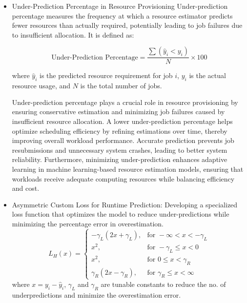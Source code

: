 \begin{itemize}
    where: \( a = y - \hat{y} \) is the residual (difference between actual and predicted values). \( \delta \) is a threshold that determines the transition between MSE and MAE.
    Huber loss is less sensitive to outliers compared to MSE and RMSE, providing a balanced approach between squared and absolute error penalties. However, it requires tuning of the threshold parameter \( \delta \), which can be challenging, and is more complex to implement than MSE and RMSE.
    \item Under-Prediction Percentage in Resource Provisioning
    Under-prediction percentage measures the frequency at which a resource estimator predicts fewer resources than actually required, potentially leading to job failures due to insufficient allocation. It is defined as:

    \begin{equation}
    \text{Under-Prediction Percentage} = \frac{\sum ( \hat{y}_i < y_i )}{N} \times 100
    \end{equation}
    
    where \( \hat{y}_i \) is the predicted resource requirement for job \( i \), \( y_i \) is the actual resource usage, and \( N \) is the total number of jobs.
    
    Under-prediction percentage plays a crucial role in resource provisioning by ensuring conservative estimation and minimizing job failures caused by insufficient resource allocation. A lower under-prediction percentage helps optimize scheduling efficiency by refining estimations over time, thereby improving overall workload performance. Accurate prediction prevents job resubmissions and unnecessary system crashes, leading to better system reliability. Furthermore, minimizing under-prediction enhances adaptive learning in machine learning-based resource estimation models, ensuring that workloads receive adequate computing resources while balancing efficiency and cost.
    \item Asymmetric Custom Loss for Runtime Prediction: Developing a specialized loss function \cite{ehrig2020customizable} that optimizes the model to reduce under-predictions while minimizing the percentage error in overestimation.
    \begin{equation}
    L_H(x) =
    \begin{cases} 
        -\gamma_L(2x + \gamma_L), & \text{for } -\infty < x < -\gamma_L \\
        x^2, & \text{for } -\gamma_L \leq x < 0 \\
        x^2, & \text{for } 0 \leq x < \gamma_R \\
        \gamma_R(2x - \gamma_R), & \text{for } \gamma_R \leq x < \infty
    \end{cases}
    \label{Form:Custom_Assyn_Loss}
    \end{equation}
    where \( x = y_i - \hat{y}_i\), \( \gamma_L \) and \( \gamma_R \) are tunable constants to reduce the no. of underpredictions and minimize the overestimation error.

\end{itemize} 

